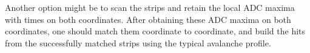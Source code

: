 Another option might be to scan the strips and retain the local ADC maxima with times on both coordinates. After obtaining these ADC maxima on both coordinates, one should match them coordinate to coordinate, and build the hits from the successfully matched strips using the typical avalanche profile.

%
%
%
%

%
%
%
